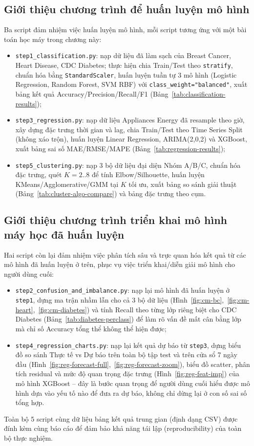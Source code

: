 \subsection{Giới thiệu chương trình để huấn luyện mô hình}

Ba script đảm nhiệm việc huấn luyện mô hình, mỗi script tương ứng với một bài toán học máy trong chương này:
\begin{itemize}
    \item \texttt{step1\_classification.py}: nạp dữ liệu đã làm sạch của Breast Cancer, Heart Disease, CDC Diabetes; thực hiện chia Train/Test theo \texttt{stratify}, chuẩn hóa bằng \texttt{StandardScaler}, huấn luyện tuần tự 3 mô hình (Logistic Regression, Random Forest, SVM RBF) với \texttt{class\_weight="balanced"}, xuất bảng kết quả Accuracy/Precision/Recall/F1 (Bảng~\ref{tab:classification-results});
    \item \texttt{step3\_regression.py}: nạp dữ liệu Appliances Energy đã resample theo giờ, xây dựng đặc trưng thời gian và lag, chia Train/Test theo Time Series Split (không xáo trộn), huấn luyện Linear Regression, ARIMA(2,0,2) và XGBoost, xuất bảng sai số MAE/RMSE/MAPE (Bảng~\ref{tab:regression-results});
    \item \texttt{step5\_clustering.py}: nạp 3 bộ dữ liệu đại diện Nhóm A/B/C, chuẩn hóa đặc trưng, quét $K=2..8$ để tính Elbow/Silhouette, huấn luyện KMeans/Agglomerative/GMM tại $K$ tối ưu, xuất bảng so sánh giải thuật (Bảng~\ref{tab:cluster-algo-compare}) và bảng đặc trưng theo cụm.
\end{itemize}

\subsection{Giới thiệu chương trình triển khai mô hình máy học đã huấn luyện}

Hai script còn lại đảm nhiệm việc phân tích sâu và trực quan hóa kết quả từ các mô hình đã huấn luyện ở trên, phục vụ việc triển khai/diễn giải mô hình cho người dùng cuối:
\begin{itemize}
    \item \texttt{step2\_confusion\_and\_imbalance.py}: nạp lại mô hình đã huấn luyện ở \texttt{step1}, dựng ma trận nhầm lẫn cho cả 3 bộ dữ liệu (Hình~\ref{fig:cm-bc},~\ref{fig:cm-heart},~\ref{fig:cm-diabetes}) và tính Recall theo từng lớp riêng biệt cho CDC Diabetes (Bảng~\ref{tab:diabetes-perclass}) để làm rõ vấn đề mất cân bằng lớp mà chỉ số Accuracy tổng thể không thể hiện được;
    \item \texttt{step4\_regression\_charts.py}: nạp lại kết quả dự báo từ \texttt{step3}, dựng biểu đồ so sánh Thực tế vs Dự báo trên toàn bộ tập test và trên cửa sổ 7 ngày đầu (Hình~\ref{fig:reg-forecast-full},~\ref{fig:reg-forecast-zoom}), biểu đồ scatter, phân tích residual và mức độ quan trọng đặc trưng (Hình~\ref{fig:reg-feat-imp}) của mô hình XGBoost -- đây là bước quan trọng để người dùng cuối hiểu được mô hình dựa vào yếu tố nào để đưa ra dự báo, không chỉ dừng lại ở con số sai số tổng hợp.
\end{itemize}

Toàn bộ 5 script cùng dữ liệu bảng kết quả trung gian (định dạng CSV) được đính kèm cùng báo cáo để đảm bảo khả năng tái lập (reproducibility) của toàn bộ thực nghiệm.
